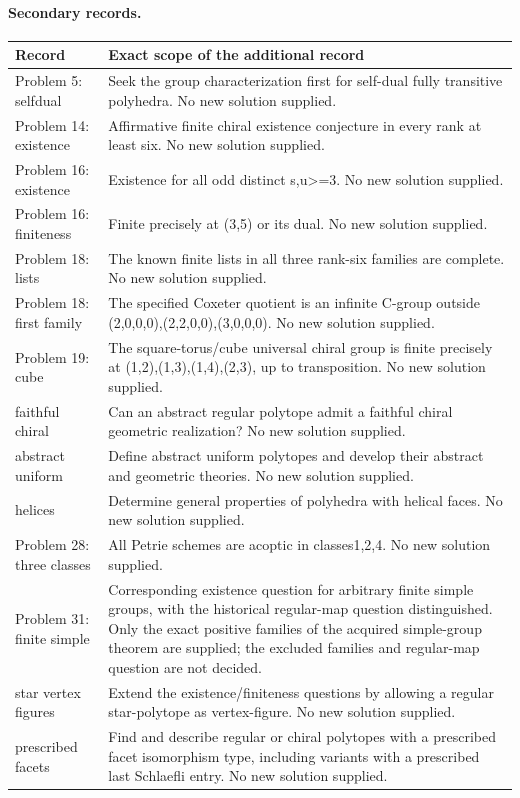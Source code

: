 \paragraph{Secondary records.}
\small
\begin{longtable}{@{}>{\raggedright\arraybackslash}p{}>{\raggedright\arraybackslash}p{}@{}}
\toprule Record & Exact scope of the additional record\\\midrule\endhead
Problem 5: selfdual & Seek the group characterization first for self-dual fully transitive polyhedra. No new solution supplied.\\[5pt]
Problem 14: existence & Affirmative finite chiral existence conjecture in every rank at least six. No new solution supplied.\\[5pt]
Problem 16: existence & Existence for all odd distinct s,u>=3. No new solution supplied.\\[5pt]
Problem 16: finiteness & Finite precisely at (3,5) or its dual. No new solution supplied.\\[5pt]
Problem 18: lists & The known finite lists in all three rank-six families are complete. No new solution supplied.\\[5pt]
Problem 18: first family & The specified Coxeter quotient is an infinite C-group outside (2,0,0,0),(2,2,0,0),(3,0,0,0). No new solution supplied.\\[5pt]
Problem 19: cube & The square-torus/cube universal chiral group is finite precisely at (1,2),(1,3),(1,4),(2,3), up to transposition. No new solution supplied.\\[5pt]
faithful chiral & Can an abstract regular polytope admit a faithful chiral geometric realization? No new solution supplied.\\[5pt]
abstract uniform & Define abstract uniform polytopes and develop their abstract and geometric theories. No new solution supplied.\\[5pt]
helices & Determine general properties of polyhedra with helical faces. No new solution supplied.\\[5pt]
Problem 28: three classes & All Petrie schemes are acoptic in classes1,2,4. No new solution supplied.\\[5pt]
Problem 31: finite simple & Corresponding existence question for arbitrary finite simple groups, with the historical regular-map question distinguished. Only the exact positive families of the acquired simple-group theorem are supplied; the excluded families and regular-map question are not decided.\\[5pt]
star vertex figures & Extend the existence/finiteness questions by allowing a regular star-polytope as vertex-figure. No new solution supplied.\\[5pt]
prescribed facets & Find and describe regular or chiral polytopes with a prescribed facet isomorphism type, including variants with a prescribed last Schlaefli entry. No new solution supplied.\\[5pt]
\bottomrule
\end{longtable}
\normalsize
